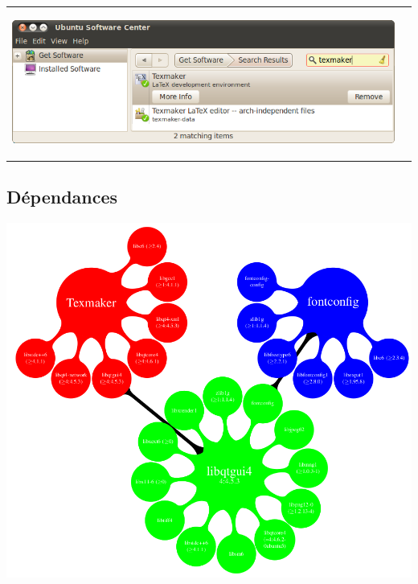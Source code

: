 \documentclass{beamer}
\begin{document}
\begin{frame}[fragile]
\begin{tabular}{c c}
\begin{minipage}{0.6\linewidth}
\begin{center}
      \includegraphics[width=\linewidth]{images/Logitheque}
      \end{center}
    \end{minipage}
  \end{tabular}
\end{frame}

\subsection*{D\'ependances}
\begin{frame}
	\begin{center}
		\includegraphics[width=0.9\linewidth]{images/depends}
	\end{center}
\end{frame}
\end{document}
